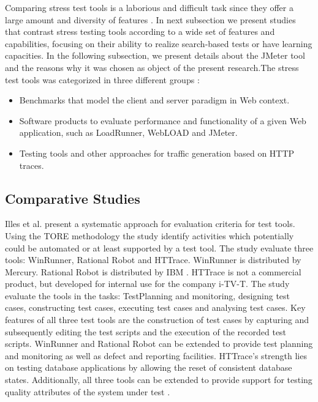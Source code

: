 \documentclass[espaco=umemeio,chapter=TITLE,twoside,openright]{abnt}
\begin{document}
Comparing stress test tools is a laborious and difficult task since they offer a large amount and diversity of features \cite{Dustin1999}. In next subsection we present studies that contrast stress testing tools according to a wide set of features and capabilities, focusing on their ability to realize search-based tests or have learning capacities. In the following subsection, we present details about the JMeter tool and the reasons why it was chosen as object of the present research.The stress test tools was categorized in three different groups \cite{MohammadS.Obaidat}:

\begin{itemize}
\item Benchmarks that model the client and server paradigm in Web context.
\item Software products to evaluate performance and functionality of a given Web application, such as LoadRunner, WebLOAD and JMeter.
\item Testing tools and other approaches for traffic generation based on HTTP traces.
\end{itemize}

\subsection{Comparative Studies}

Illes et al. present a systematic approach for evaluation criteria for test tools. Using the TORE methodology the study identify activities which potentially could be automated or at least supported by a test tool. The study evaluate three tools: WinRunner, Rational Robot  and HTTrace. WinRunner is distributed by Mercury.  Rational Robot is distributed by IBM . HTTrace is not a commercial product, but developed for internal use for the company i-TV-T. The study evaluate the tools in the tasks: TestPlanning and monitoring, designing test cases, constructing test cases, executing test cases and analysing test cases. Key features of all three test tools are the construction of test cases by
capturing and subsequently editing the test scripts and the execution of the recorded test
scripts.  WinRunner and Rational Robot can be extended to provide test planning and monitoring as well as defect and reporting facilities. HTTrace’s strength lies on testing database applications by allowing the reset of consistent database states. Additionally, all three tools can be extended to provide support for testing quality attributes of the system under test \cite{Illes2005}.
\end{document}
